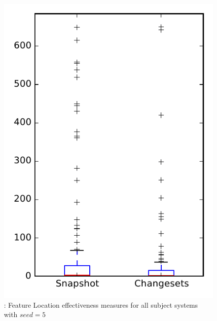 
\begin{figure}
\centering
\includegraphics[height=0.4\textheight]{figures/flt_seed/rq1_overview_5}
\caption{\rone: Feature Location effectiveness measures for all subject systems with $seed=5$}
\label{fig:flt_seed:rq1:overview}
\end{figure}
